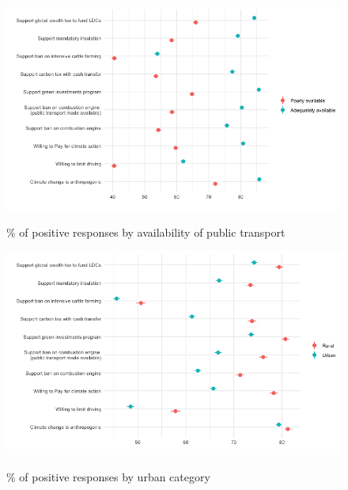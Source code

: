 	\begin{frame}{}%
	\begin{figure}[h!]
	\caption{\% of positive responses by availability of public transport}
	\includegraphics[width=.7\paperwidth]{../figures/country_comparison/main_var_by_country_availability_transport_all.png} \\
	\end{figure}
	\end{frame}
	
	\begin{frame}{}%
	\begin{figure}[h!]
	\caption{\% of positive responses by urban category}
	\includegraphics[width=.7\paperwidth]{../figures/country_comparison/main_var_by_country_urban_all.png} \\
	\end{figure}
	\end{frame}
	
